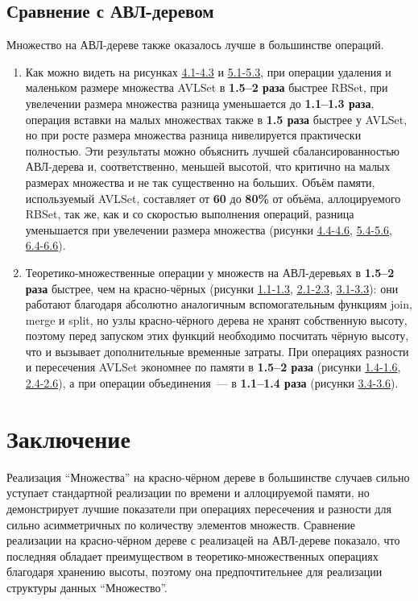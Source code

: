 \documentclass[a4paper]{article}
\begin{document}
\subsection{Сравнение с АВЛ-деревом}
Множество на АВЛ-дереве также оказалось лучше в большинстве операций.
\begin{enumerate}
    \item Как можно видеть на рисунках \href{images.pdf#page=7}{4.1-4.3} и \href{images.pdf#page=9}{5.1-5.3}, при операции удаления и маленьком размере множества AVLSet в \textbf{1.5--2 раза} быстрее RBSet, при увелечении размера множества 
    разница уменьшается до \textbf{1.1--1.3 раза}, операция вставки на малых множествах также в \textbf{1.5 раза} быстрее у AVLSet, но при росте 
    размера множества разница нивелируется практически полностью. Эти результаты можно объяснить лучшей сбалансированностью АВЛ-дерева и, соответственно,
    меньшей высотой, что критично на малых размерах множества и не так существенно на больших.
    Объём памяти, используемый AVLSet, составляет от \textbf{60} до \textbf{80\%}  от объёма, аллоцируемого RBSet, так же, как и со
    скоростью выполнения операций, разница уменьшается при увелечении размера множества (рисунки \href{images.pdf#page=8}{4.4-4.6}, 
    \href{images.pdf#page=10}{5.4-5.6}, \href{images.pdf#page=12}{6.4-6.6}).
    \item Теоретико-множественные операции у множеств на АВЛ-деревьях в \textbf{1.5--2 раза} быстрее, чем на красно-чёрных (рисунки \href{images.pdf#page=1}{1.1-1.3}, 
    \href{images.pdf#page=3}{2.1-2.3}, \href{images.pdf#page=5}{3.1-3.3}): они работают благодаря абсолютно 
    аналогичным вспомогательным функциям join, merge и split, но узлы красно-чёрного дерева не хранят собственную высоту, поэтому перед запуском этих 
    функций необходимо посчитать чёрную высоту, что и вызывает дополнительные временные затраты.
    При операциях разности и пересечения AVLSet экономнее по памяти в \textbf{1.5--2 раза} (рисунки \href{images.pdf#page=2}{1.4-1.6}, 
    \href{images.pdf#page=4}{2.4-2.6}), а при операции объединения~--- в \textbf{1.1--1.4 раза} (рисунки \href{images.pdf#page=6}{3.4-3.6}).
\end{enumerate}

\section{Заключение}

Реализация \enquote{Множества} на красно-чёрном дереве в большинстве случаев сильно уступает стандартной реализации по времени и аллоцируемой памяти, 
но демонстрирует лучшие показатели при операциях пересечения и разности для сильно асимметричных по количеству элементов множеств.
Сравнение реализации на красно-чёрном дереве с реализацей на АВЛ-дереве показало, что последняя обладает преимуществом в теоретико-множественных операциях благодаря 
хранению высоты, поэтому она предпочтительнее для реализации структуры данных \enquote{Множество}. 
\end{document}
